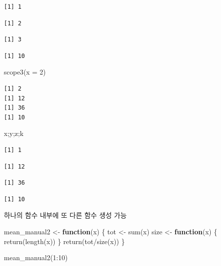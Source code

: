 \documentclass[
  11pt,
]{krantz}
\newenvironment{Shaded}{\begin{snugshade}}{\end{snugshade}}
\newcommand{\AttributeTok}[1]{\textcolor[rgb]{0.61,0.61,0.61}{#1}}
\newcommand{\ControlFlowTok}[1]{\textcolor[rgb]{0.27,0.27,0.27}{\textbf{#1}}}
\newcommand{\DecValTok}[1]{\textcolor[rgb]{0.06,0.06,0.06}{#1}}
\newcommand{\FunctionTok}[1]{\textcolor[rgb]{0,0,0}{#1}}
\newcommand{\NormalTok}[1]{#1}
\newcommand{\OtherTok}[1]{\textcolor[rgb]{0.37,0.37,0.37}{#1}}
\newcommand{\SpecialCharTok}[1]{\textcolor[rgb]{0,0,0}{#1}}
\begin{document}
\begin{verbatim}
[1] 1
\end{verbatim}

\begin{verbatim}
[1] 2
\end{verbatim}

\begin{verbatim}
[1] 3
\end{verbatim}

\begin{verbatim}
[1] 10
\end{verbatim}

\begin{Shaded}
\begin{Highlighting}[]
\FunctionTok{scope3}\NormalTok{(}\AttributeTok{x =} \DecValTok{2}\NormalTok{)}
\end{Highlighting}
\end{Shaded}

\begin{verbatim}
[1] 2
[1] 12
[1] 36
[1] 10
\end{verbatim}

\begin{Shaded}
\begin{Highlighting}[]
\NormalTok{x;y;z;k}
\end{Highlighting}
\end{Shaded}

\begin{verbatim}
[1] 1
\end{verbatim}

\begin{verbatim}
[1] 12
\end{verbatim}

\begin{verbatim}
[1] 36
\end{verbatim}

\begin{verbatim}
[1] 10
\end{verbatim}

\normalsize

하나의 함수 내부에 또 다른 함수 생성 가능

\footnotesize

\begin{Shaded}
\begin{Highlighting}[]
\NormalTok{mean\_manual2 }\OtherTok{\textless{}{-}} \ControlFlowTok{function}\NormalTok{(x) \{}
\NormalTok{  tot }\OtherTok{\textless{}{-}} \FunctionTok{sum}\NormalTok{(x)}
\NormalTok{  size }\OtherTok{\textless{}{-}} \ControlFlowTok{function}\NormalTok{(x) \{}
    \FunctionTok{return}\NormalTok{(}\FunctionTok{length}\NormalTok{(x))}
\NormalTok{  \}}
  \FunctionTok{return}\NormalTok{(tot}\SpecialCharTok{/}\FunctionTok{size}\NormalTok{(x))}
\NormalTok{\}}

\FunctionTok{mean\_manual2}\NormalTok{(}\DecValTok{1}\SpecialCharTok{:}\DecValTok{10}\NormalTok{)}
\end{Highlighting}
\end{Shaded}
\end{document}
